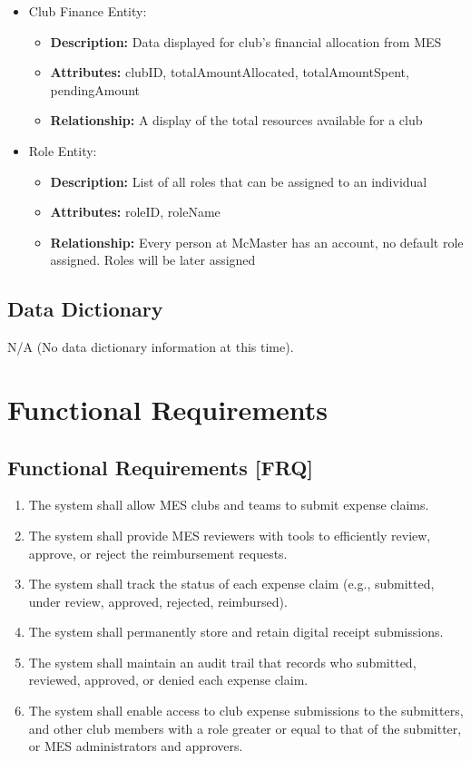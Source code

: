 \documentclass[12pt]{article}
\begin{document}
\begin{itemize}
    \item Club Finance Entity:
      \begin{itemize}
          \item \textbf{Description:} Data displayed for club's financial allocation from MES
          \item \textbf{Attributes:} clubID, totalAmountAllocated, totalAmountSpent, pendingAmount
          \item \textbf{Relationship:} A display of the total resources available for a club 
        \end{itemize}

    \item Role Entity:
      \begin{itemize}
          \item \textbf{Description:} List of all roles that can be assigned to an individual
          \item \textbf{Attributes:} roleID, roleName
          \item \textbf{Relationship:} Every person at McMaster has an account, no default role assigned. Roles will be later assigned
        \end{itemize}
  \end{itemize}
  \subsection{Data Dictionary}
  N/A (No data dictionary information at this time).

\section{Functional Requirements}
  \subsection{Functional Requirements [FRQ]}
    \begin{enumerate}
      \item The system shall allow MES clubs and teams to submit expense claims. 
      \item The system shall provide MES reviewers with tools to efficiently review, approve, or reject the reimbursement requests.
      \item The system shall track the status of each expense claim (e.g., submitted, under review, approved, rejected, reimbursed).
      \item The system shall permanently store and retain digital receipt submissions.
      \item The system shall maintain an audit trail that records who submitted, reviewed, approved, or denied each expense claim.
      \item The system shall enable access to club expense submissions to the submitters, and other club members with a role greater or equal to that of the submitter, or MES administrators and approvers.
    \end{enumerate}
\end{document}
